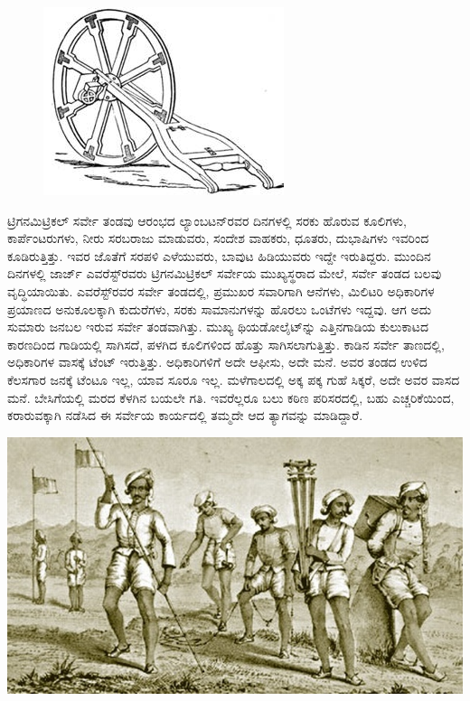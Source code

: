 \begin{figure}
\includegraphics[scale=0.6]{"images/image008.jpg"}
\end{figure}

ಟ್ರಿಗನಮಿಟ್ರಿಕಲ್​ ಸರ್ವೇ ತಂಡವು ಆರಂಭದ ಲ್ಯಾಂಬಟನ್​ರವರ ದಿನಗಳಲ್ಲಿ ಸರಕು ಹೊರುವ ಕೂಲಿಗಳು, ಕಾರ್ಪೆಂಟರುಗಳು, ನೀರು ಸರಬರಾಜು ಮಾಡುವರು, ಸಂದೇಶ ವಾಹಕರು, ಧೂತರು, ದುಭಾಷಿಗಳು ಇವರಿಂದ ಕೂಡಿರುತ್ತಿತ್ತು. ಇವರ ಜೊತೆಗೆ ಸರಪಳಿ ಎಳೆಯುವರು, ಬಾವುಟ ಹಿಡಿಯುವರು ಇದ್ದೇ ಇರುತಿದ್ದರು. ಮುಂದಿನ ದಿನಗಳಲ್ಲಿ ಜಾರ್ಜ್ ಎವರೆಸ್ಟ್​ರವರು ಟ್ರಿಗನಮಿಟ್ರಿಕಲ್​ ಸರ್ವೇಯ ಮುಖ್ಯಸ್ಥರಾದ ಮೇಲೆ, ಸರ್ವೇ ತಂಡದ ಬಲವು ವೃದ್ಧಿಯಾಯಿತು. ಎವರೆಸ್ಟ್​ರವರ ಸರ್ವೇ ತಂಡದಲ್ಲಿ, ಪ್ರಮುಖರ ಸವಾರಿಗಾಗಿ  ಆನೆಗಳು, ಮಿಲಿಟರಿ ಅಧಿಕಾರಿಗಳ ಪ್ರಯಾಣದ ಅನುಕೂಲಕ್ಕಾಗಿ  ಕುದುರೆಗಳು, ಸರಕು ಸಾಮಾನುಗಳನ್ನು ಹೊರಲು  ಒಂಟೆಗಳು ಇದ್ದವು. ಆಗ ಅದು ಸುಮಾರು  ಜನಬಲ ಇರುವ ಸರ್ವೇ ತಂಡವಾಗಿತ್ತು. ಮುಖ್ಯ ಥಿಯಡೋಲೈಟ್​ನ್ನು ಎತ್ತಿನಗಾಡಿಯ ಕುಲುಕಾಟದ ಕಾರಣದಿಂದ ಗಾಡಿಯಲ್ಲಿ ಸಾಗಿಸದೆ, ಪಳಗಿದ ಕೂಲಿಗಳಿಂದ ಹೊತ್ತು ಸಾಗಿಸಲಾಗುತ್ತಿತ್ತು. ಕಾಡಿನ ಸರ್ವೇ ತಾಣದಲ್ಲಿ, ಅಧಿಕಾರಿಗಳ ವಾಸಕ್ಕೆ ಟೆಂಟ್​ ಇರುತ್ತಿತ್ತು. ಅಧಿಕಾರಿಗಳಿಗೆ ಅದೇ ಆಫೀಸು, ಅದೇ ಮನೆ. ಅವರ ತಂಡದ ಉಳಿದ ಕೆಲಸಗಾರ ಜನಕ್ಕೆ ಟೆಂಟೂ ಇಲ್ಲ, ಯಾವ ಸೂರೂ ಇಲ್ಲ. ಮಳೆಗಾಲದಲ್ಲಿ ಅಕ್ಕ ಪಕ್ಕ ಗುಹೆ ಸಿಕ್ಕರೆ, ಅದೇ ಅವರ ವಾಸದ ಮನೆ. ಬೇಸಿಗೆಯಲ್ಲಿ ಮರದ ಕೆಳಗಿನ ಬಯಲೇ ಗತಿ. ಇವರೆಲ್ಲರೂ ಬಲು ಕಠಿಣ ಪರಿಸರದಲ್ಲಿ, ಬಹು ಎಚ್ಚರಿಕೆಯಿಂದ, ಕರಾರುವಕ್ಕಾಗಿ ನಡೆಸಿದ ಈ ಸರ್ವೇಯ ಕಾರ್ಯದಲ್ಲಿ ತಮ್ಮದೇ ಆದ ತ್ಯಾಗವನ್ನು ಮಾಡಿದ್ದಾರೆ.

\begin{center}
\includegraphics[scale=0.6]{"images/image009.jpg"}
\end{center}

